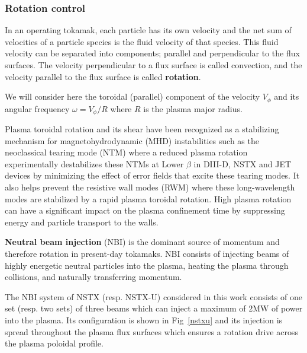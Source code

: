 \documentclass[12pt,lot, lof]{puthesis}
\begin{document}
\subsubsection{{Rotation control}} 

In an operating tokamak, each particle has its own velocity and the net sum of velocities of a particle species is the fluid velocity of that species. This fluid velocity can be separated into components; parallel and perpendicular to the flux surfaces. The velocity perpendicular to a flux surface is called convection, and the velocity parallel to the flux surface is called \textbf{rotation}.

We will consider here the toroidal (parallel) component of the velocity $V_{\phi}$ and its angular frequency $\omega = V_{\phi} / R$ where $R$ is the plasma major radius.

Plasma toroidal rotation and its shear have been recognized as a stabilizing mechanism for magnetohydrodynamic (MHD) instabilities such as the neoclassical tearing mode (NTM) \cite{LaHaye10} where a reduced plasma rotation experimentally destabilizes these NTMs at Lower $\beta$ in DIII-D, NSTX and JET devices by minimizing the effect of error fields that excite these tearing modes. It also helps prevent the resistive wall modes (RWM) \cite{Garofalo02} where these long-wavelength modes are stabilized by a rapid plasma toroidal rotation.
High plasma rotation can have a significant impact on the plasma confinement time by suppressing energy and particle transport to the walls.

\textbf{Neutral beam injection} (NBI) is the dominant source of momentum and therefore rotation in present-day tokamaks. NBI consists of injecting beams of highly energetic neutral particles into the plasma, heating the plasma through collisions, and naturally transferring momentum. 


The NBI system of NSTX (resp. NSTX-U) considered in this work consists of one set (resp. two sets) of three beams which can inject a maximum of $2$MW of power into the plasma. Its configuration is shown in Fig~\ref{nstxu} and its injection is spread throughout the plasma flux surfaces which ensures a rotation drive across the plasma poloidal profile. 
\end{document}
